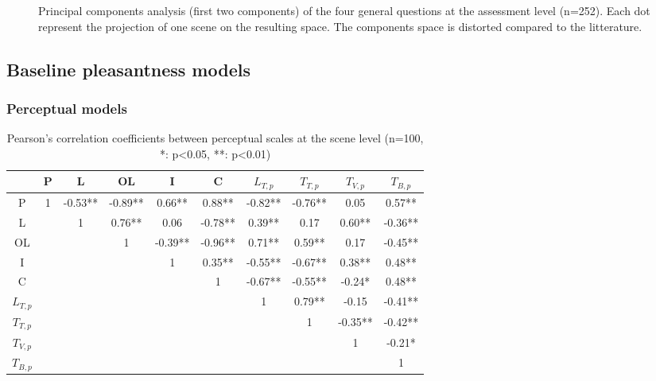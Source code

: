 \documentclass[11pt,a4paper]{article}
\begin{document}
\begin{figure}[h]
\begin{subfigure}[t]{0.5\textwidth}
    \end{subfigure}
    \caption{Principal components analysis (first two components) of the four general questions at the assessment level (n=252). Each dot represent the projection of one scene on the resulting space. The components space is distorted compared to the litterature.}\label{fig:pspace}
\end{figure}

\subsection{Baseline pleasantness models}
\label{sec:base}


\subsubsection{Perceptual models}
\label{sec:base_perc}

\begin{table}[h]
\centering
\caption{Pearson's correlation coefficients between perceptual scales at the scene level (n=100, *: p<0.05, **: p<0.01)}
\label{tab:percc}
\begin{tabular}{ c | c c c c c c c c c }
\hline
	 & P & L & OL & I & C & $L_{T, p}$ & $T_{T, p}$ & $T_{V, p}$ & $T_{B, p}$ \\ \hline
	P & 1 & -0.53** & -0.89** & 0.66** & 0.88** & -0.82** & -0.76** & 0.05 & 0.57** \\
	L &  & 1 & 0.76** & 0.06 & -0.78** & 0.39** & 0.17 & 0.60** & -0.36** \\
	OL &  &  & 1 & -0.39** & -0.96** & 0.71** & 0.59** & 0.17 & -0.45** \\
	I &  &  &  & 1 & 0.35** & -0.55** & -0.67** & 0.38** & 0.48** \\
	C &  &  &  &  & 1 & -0.67** & -0.55** & -0.24* & 0.48** \\
	$L_{T, p}$ &  &  &  &  &  & 1 & 0.79** & -0.15 & -0.41** \\
	$T_{T, p}$ &  &  &  &  &  &  & 1 & -0.35** & -0.42** \\
	$T_{V, p}$ &  &  &  &  &  &  &  & 1 & -0.21* \\
	$T_{B, p}$ &  &  &  &  &  &  &  &  & 1 \\ \hline
\end{tabular}
\end{table}
\end{document}
